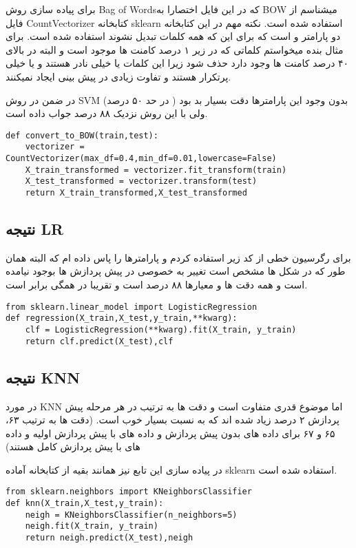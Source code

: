 \documentclass{article}[12pt]
\begin{document}
برای پیاده سازی روش Bag of Wordsکه در این فایل اختصارا به BOW میشناسم از فایل CountVectorizer 
کتابخانه sklearn استفاده شده است. نکته مهم در این کتابخانه دو پارامتر 
و 
است که برای این که همه کلمات تبدیل نشوند استفاده شده است. برای مثال بنده میخواستم کلماتی که در زیر ۱ درصد کامنت ها موجود است و البته در بالای ۴۰ درصد کامنت ها وجود دارد حذف شود زیرا این کلمات یا خیلی نادر هستند و یا خیلی پرتکرار هستند و تفاوت زیادی در پیش بینی ایجاد نمیکنند. 

در ضمن در روش SVM 
بدون وجود این پارامترها دقت بسیار بد بود (
در حد ۵۰ درصد)
ولی با این روش نزدیک ۸۸ درصد جواب داده است. 


\begin{verbatim}
def convert_to_BOW(train,test):
    vectorizer = CountVectorizer(max_df=0.4,min_df=0.01,lowercase=False)
    X_train_transformed = vectorizer.fit_transform(train)
    X_test_transformed = vectorizer.transform(test)
    return X_train_transformed,X_test_transformed
\end{verbatim}

\subsection{نتیجه LR}
برای رگرسیون خطی از کد زیر استفاده کردم و پارامترها را پاس داده ام که البته همان طور که در شکل ها مشخص است تغییر به خصوصی در پیش پردازش ها بوجود نیامده است و همه دقت ها و معیارها ۸۸ درصد است و تقریبا در همگی برابر است. 
\begin{verbatim}
from sklearn.linear_model import LogisticRegression
def regression(X_train,X_test,y_train,**kwarg):
    clf = LogisticRegression(**kwarg).fit(X_train, y_train)
    return clf.predict(X_test),clf
\end{verbatim}


\subsection{نتیجه KNN}
در مورد KNN اما موضوع قدری متفاوت است و دقت ها به ترتیب در هر مرحله پیش پردازش ۲ درصد زیاد شده اند که به نسبت بسیار خوب است. 
(دقت ها به ترتیب ۶۳، ۶۵ و ۶۷ برای داده های بدون پیش پردازش و داده های با پیش پردازش اولیه و داده های با پیش پردازش کامل هستند)

در پیاده سازی این تابع نیز همانند بقیه از کتابخانه آماده sklearn استفاده شده است. 
\begin{verbatim}
from sklearn.neighbors import KNeighborsClassifier
def knn(X_train,X_test,y_train):
    neigh = KNeighborsClassifier(n_neighbors=5)
    neigh.fit(X_train, y_train)
    return neigh.predict(X_test),neigh
\end{verbatim}
\end{document}
